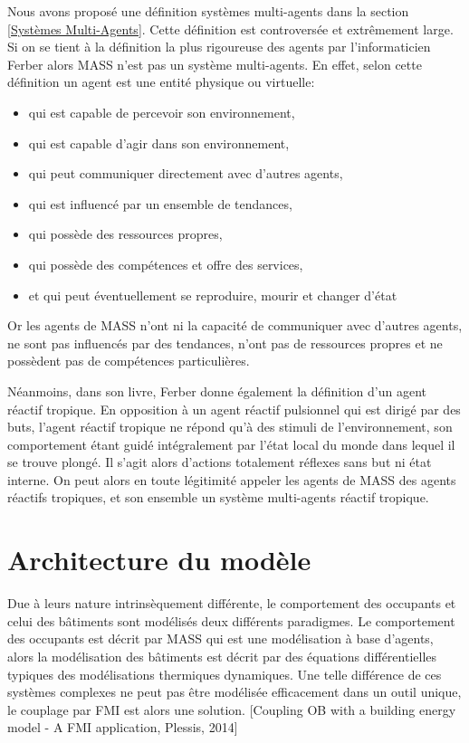 Nous avons proposé une définition systèmes multi-agents dans la section \ref{Systèmes Multi-Agents}. Cette définition est controversée et extrêmement large. Si on se tient à la définition la plus rigoureuse des agents par l'informaticien Ferber \cite{Ferber-95} alors MASS n'est pas un système multi-agents. En effet, selon cette définition un agent est une entité physique ou virtuelle:
\begin{itemize}
  \item qui est capable de percevoir son environnement,
  \item qui est capable d'agir dans son environnement, 
  \item qui peut communiquer directement avec d'autres agents,
  \item qui est influencé par un ensemble de tendances,
  \item qui possède des ressources propres,
  \item qui possède des compétences et offre des services,
  \item et qui peut éventuellement se reproduire, mourir et changer d'état
\end{itemize}
Or les agents de MASS n'ont ni la capacité de communiquer avec d'autres agents, ne sont pas influencés par des tendances, n'ont pas de ressources propres et ne possèdent pas de compétences particulières.

Néanmoins, dans son livre, Ferber \cite{Ferber-95} donne également la définition d'un agent réactif tropique. En opposition à un agent réactif pulsionnel qui est dirigé par des buts, l'agent réactif tropique ne répond qu'à des stimuli de l'environnement, son comportement étant guidé intégralement par l'état local du monde dans lequel il se trouve plongé. Il s'agit alors d'actions totalement réflexes sans but ni état interne. On peut alors en toute légitimité appeler les agents de MASS des agents réactifs tropiques, et son ensemble un système multi-agents réactif tropique.

\section{Architecture du modèle}

Due à leurs nature intrinsèquement différente, le comportement des occupants et celui des bâtiments sont modélisés deux différents paradigmes. Le comportement des occupants est décrit par MASS qui est une modélisation à base d'agents, alors la modélisation des bâtiments est décrit par des équations différentielles typiques des modélisations thermiques dynamiques. Une telle différence de ces systèmes complexes ne peut pas être modélisée efficacement dans un outil unique, le couplage par FMI est alors une solution. [Coupling OB with a building energy model - A FMI application, Plessis, 2014]

